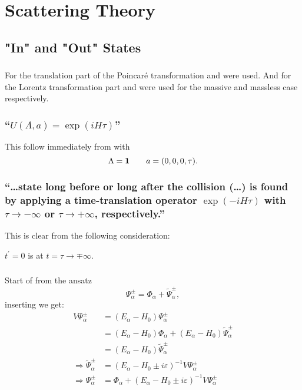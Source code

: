 \section{Scattering Theory}\label{sec:chapter3}

\subsection{"In" and "Out" States}\label{susec:3_1}


\subsubsection{ }
For the translation part of the Poincaré transformation  and  were used. And for the Lorentz transformation part  and  were used for the massive and massless case respectively.


\subsubsection{\enquote{$U(\Lambda,a)=\exp(iH\tau)$} }
This follow immediately from  with \[\Lambda=\mathbf{1}\qquad a =(0,0,0,\tau).\]


\subsubsection{\enquote{\dots state long before or long after the collision (\dots) is found by applying a time-translation operator $\exp(-iH\tau) $ with $\tau\rightarrow-\infty$ or $\tau\rightarrow+\infty$, respectively.} }

This is clear from the following consideration:

$t^\prime=0$ is at $t=\tau\rightarrow \mp \infty$.

\subsubsection{ }

Start of from the ansatz
\[\Psi_\alpha^\pm=\Phi_\alpha+\tilde{\Psi}_\alpha^\pm,\]
inserting we get:
\begin{align*}
	V\Psi_\alpha^\pm&=(E_\alpha - H_0)\Psi_\alpha^\pm\\
	&=(E_\alpha-H_0)\Phi_\alpha+(E_\alpha-H_0)\tilde{\Psi}_\alpha^\pm\\
	&=(E_\alpha-H_0)\tilde{\Psi}_\alpha^\pm\\
	\Rightarrow \tilde{\Psi}_\alpha^\pm&=(E_\alpha-H_0\pm i \varepsilon)^{-1} V\Psi_\alpha^\pm\\
	\Rightarrow \Psi_\alpha^\pm&=\Phi_\alpha+(E_\alpha-H_0\pm i \varepsilon)^{-1} V\Psi_\alpha^\pm
\end{align*}

